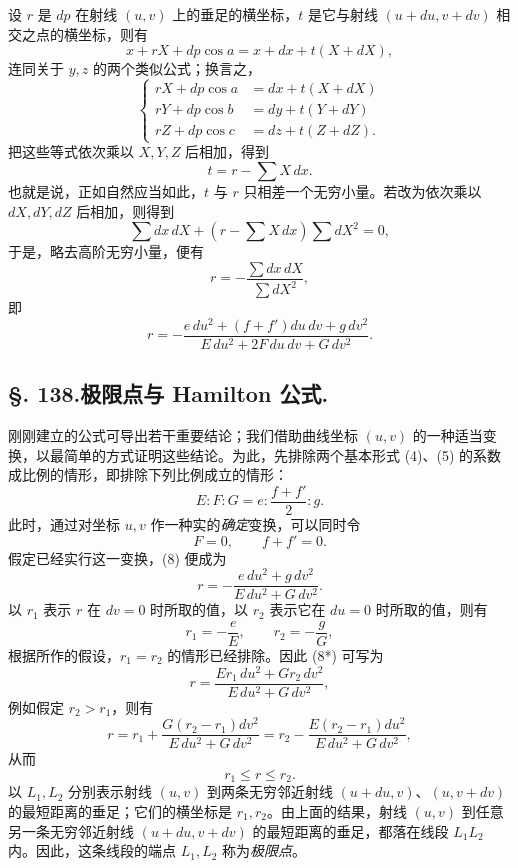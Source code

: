 设 \(r\) 是 \(dp\) 在射线 \((u,v)\) 上的垂足的横坐标，\(t\) 是它与射线 \((u+du,v+dv)\) 相交之点的横坐标，则有
\[
 x+rX+dp\cos a=x+dx+t(X+dX),
\]
连同关于 \(y,z\) 的两个类似公式；换言之，
\[
\left\{
\begin{aligned}
rX+dp\cos a&=dx+t(X+dX)\\
rY+dp\cos b&=dy+t(Y+dY)\\
rZ+dp\cos c&=dz+t(Z+dZ).
\end{aligned}
\right.
\]
把这些等式依次乘以 \(X,Y,Z\) 后相加，得到
\[
 t=r-\sum X\,dx.
\]
也就是说，正如自然应当如此，\(t\) 与 \(r\) 只相差一个无穷小量。若改为依次乘以 \(dX,dY,dZ\) 后相加，则得到
\[
 \sum dx\,dX+\left(r-\sum X\,dx\right)\sum dX^2=0,
\]
于是，略去高阶无穷小量，便有
\[
 r=-\frac{\sum dx\,dX}{\sum dX^2},
\]
即
\begin{equation}\tag{8}
 r=-\frac{e\,du^2+(f+f')du\,dv+g\,dv^2}{E\,du^2+2F\,du\,dv+G\,dv^2}.
\end{equation}

\subsection*{\S. 138.\quad 极限点与 Hamilton 公式.}

刚刚建立的公式可导出若干重要结论；我们借助曲线坐标 \((u,v)\) 的一种适当变换，以最简单的方式证明这些结论。为此，先排除两个基本形式 (4)、(5) 的系数成比例的情形，即排除下列比例成立的情形：
 \[
E:F:G=e:\frac{f+f'}2:g.
\]
此时，通过对坐标 \(u,v\) 作一种实的\emph{确定}变换，可以同时令
\[
 F=0,\qquad f+f'=0.
\]
假定已经实行这一变换，(8) 便成为
\begin{equation}\tag{8*}
 r=-\frac{e\,du^2+g\,dv^2}{E\,du^2+G\,dv^2}.
\end{equation}
以 \(r_1\) 表示 \(r\) 在 \(dv=0\) 时所取的值，以 \(r_2\) 表示它在 \(du=0\) 时所取的值，则有
\[
 r_1=-\frac eE,
 \qquad r_2=-\frac gG,
\]
根据所作的假设，\(r_1=r_2\) 的情形已经排除。因此 (8*) 可写为
\begin{equation}\tag{9}
 r=\frac{E r_1\,du^2+G r_2\,dv^2}{E\,du^2+G\,dv^2},
\end{equation}
例如假定 \(r_2>r_1\)，则有
\[
 r=r_1+\frac{G(r_2-r_1)dv^2}{E\,du^2+G\,dv^2}
  =r_2-\frac{E(r_2-r_1)du^2}{E\,du^2+G\,dv^2},
\]
从而
\[
 r_1\leq r\leq r_2.
\]
以 \(L_1,L_2\) 分别表示射线 \((u,v)\) 到两条无穷邻近射线 \((u+du,v)\)、\((u,v+dv)\) 的最短距离的垂足；它们的横坐标是 \(r_1,r_2\)。由上面的结果，射线 \((u,v)\) 到任意另一条无穷邻近射线 \((u+du,v+dv)\) 的最短距离的垂足，都落在线段 \(L_1L_2\) 内。因此，这条线段的端点 \(L_1,L_2\) 称为\emph{极限点}。

